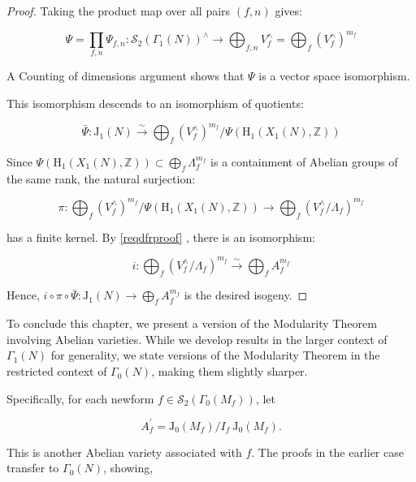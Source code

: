 \begin{theorem}
\begin{proof}
Taking the product map over all pairs \((f, n)\) gives:

\[ \Psi=\prod_{f, n} \Psi_{f, n}: \mathcal{S}_{2}\left(\Gamma_{1}(N)\right)^{\wedge} \longrightarrow \bigoplus_{f, n} V_{f}^{\wedge}=\bigoplus_{f}\left(V_{f}^{\wedge}\right)^{m_{f}} \]

A Counting of dimensions argument shows that \(\Psi\) is a vector space isomorphism.

This isomorphism descends to an isomorphism of quotients:

\[ \bar{\Psi}: \mathrm{J}_{1}(N) \stackrel{\sim}{\longrightarrow} \bigoplus_{f}\left(V_{f}^{\wedge}\right)^{m_{f}} / \Psi\left(\mathrm{H}_{1}\left(X_{1}(N), \mathbb{Z}\right)\right) \]

Since \(\Psi\left(\mathrm{H}_{1}\left(X_{1}(N), \mathbb{Z}\right)\right) \subset \bigoplus_{f} \Lambda_{f}^{m_{f}}\) is a containment of Abelian groups of the same rank, the natural surjection:

\[ \pi: \bigoplus_{f}\left(V_{f}^{\wedge}\right)^{m_{f}} / \Psi\left(\mathrm{H}_{1}\left(X_{1}(N), \mathbb{Z}\right)\right) \longrightarrow \bigoplus_{f}\left(V_{f}^{\wedge} / \Lambda_{f}\right)^{m_{f}} \]

has a finite kernel. By \ref{reqdfrproof} , there is an isomorphism:

\[ i: \bigoplus_{f}\left(V_{f}^{\wedge} / \Lambda_{f}\right)^{m_{f}} \stackrel{\sim}{\longrightarrow} \bigoplus_{f} A_{f}^{m_{f}} \]

Hence, \(i \circ \pi \circ \bar{\Psi}: \mathrm{J}_{1}(N) \longrightarrow \bigoplus_{f} A_{f}^{m_{f}}\) is the desired isogeny. 
\end{proof}
\end{theorem}

To conclude this chapter, we present a version of the Modularity Theorem involving Abelian varieties. While we develop results in the larger context of \(\Gamma_{1}(N)\) for generality, we state versions of the Modularity Theorem in the restricted context of \(\Gamma_{0}(N)\), making them slightly sharper.

Specifically, for each newform \(f \in \mathcal{S}_{2}\left(\Gamma_{0}\left(M_{f}\right)\right)\), let

\[ A_{f}^{\prime}=\mathrm{J}_{0}\left(M_{f}\right) / I_{f} \mathrm{~J}_{0}\left(M_{f}\right) . \]

This is another Abelian variety associated with \(f\). The proofs in the earlier case transfer to \(\Gamma_{0}(N)\), showing,

